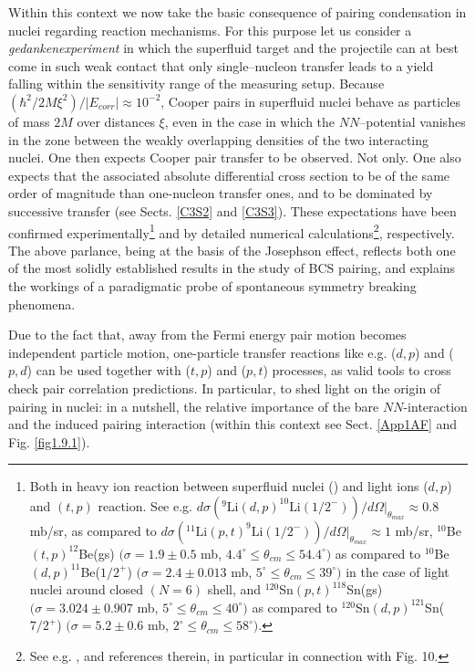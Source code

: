 Within this context we now take the basic consequence of pairing condensation in nuclei regarding reaction mechanisms. For this purpose let us consider a \textit{gedankenexperiment} in which the superfluid target and the projectile can at best come in such weak contact that only  single--nucleon transfer leads to a yield falling within the sensitivity range of the measuring setup. Because $\left(\hbar^2/2M\xi^2\right)/|E_{corr}|\approx10^{-2}$, Cooper pairs in superfluid nuclei behave as particles of mass $2M$
 over distances $\xi$, even in the case in which the $NN$--potential vanishes in the zone between the weakly overlapping densities of the two interacting nuclei. One then expects Cooper pair transfer to be observed. Not only. One also expects that the associated absolute differential cross section to be of the same order of magnitude than one-nucleon transfer ones, and to be dominated by successive transfer (see Sects. \ref{C3S2} and \ref{C3S3}). These expectations have been confirmed experimentally\footnote{\label{f28} Both in heavy ion reaction between superfluid nuclei (\cite{Montanari:14}) and light ions ($d,p$) and $(t,p)$ reaction. See e.g. \cite{Cavallaro:17} $d\sigma(^9\text{Li} (d,p)^{10}\text{Li} (1/2^-))/d\Omega|_{\theta_{max}}\approx0.8$ mb/sr, as compared to \cite{Tanihata:08}  $d\sigma(^{11}\text{Li} (p,t)^{9}\text{Li} (1/2^-))/d\Omega|_{\theta_{max}}\approx1 $ mb/sr, \cite{Fortune:94} $^{10}$Be$(t,p)^{12}$Be(gs) $(\sigma=1.9\pm0.5$ mb, $4.4^\circ\leq\theta_{cm}\leq54.4^\circ)$ as compared to \cite{Schmitt:13} 
 	$^{10}$Be$(d,p)^{11}$Be($1/2^+$) $(\sigma=2.4\pm0.013$ mb, $5^\circ\leq\theta_{cm}\leq39^\circ)$ in the case of light nuclei around closed $(N=6)$ shell, and \cite{Bassani:65} $^{120}$Sn$(p,t)^{118}$Sn(gs) $(\sigma=3.024\pm0.907$ mb, $5^\circ\leq\theta_{cm}\leq40^\circ)$ as compared to \cite{Bechara:75} $^{120}$Sn$(d,p)^{121}$Sn($7/2^+$) $(\sigma=5.2\pm0.6$ mb, $2^\circ\leq\theta_{cm}\leq58^\circ)$.} and by detailed numerical calculations\footnote{See e.g. \cite{Potel:13}, and references therein, in particular in connection with Fig. 10.}, respectively.
 The above parlance, being at the basis of the Josephson effect, reflects both one of the most solidly established results in the study of BCS pairing, and explains the workings of a paradigmatic probe of spontaneous symmetry breaking phenomena.
 
 
 
Due to the fact that, away from the Fermi energy pair  motion becomes independent particle motion, one-particle transfer reactions like e.g. ($d,p$) and ($p,d$) can be used together with ($t,p$) and ($p,t$) processes, as  valid tools to cross check pair correlation predictions. In particular, to shed light on the origin of pairing in nuclei: in a nutshell, the relative importance of the bare $NN$-interaction and the induced pairing interaction (within this context see Sect. \ref{App1AF} and Fig. \ref{fig1.9.1}).

